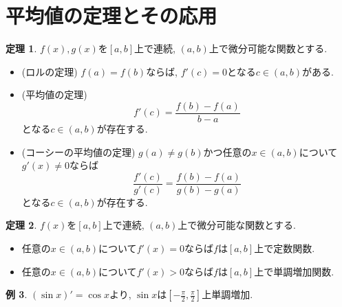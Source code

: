 \documentclass[dvipdfmx,a4paper,11pt]{article}
\theoremstyle{definition}
\newtheorem{thm}{定理}
\newtheorem{exa}[thm]{例}
\begin{document}
\section{平均値の定理とその応用}
\begin{tcolorbox}[
    colback = white,
    colframe = green!35!black,
    fonttitle = \bfseries,
    breakable = true]
    \begin{thm}
    $f(x), g(x)$を$[a,b]$上で連続, $(a,b)$上で微分可能な関数とする.
\begin{itemize}
\item (ロルの定理) $f(a) = f(b)$ならば, $f'(c) = 0$となる$c \in (a,b)$がある.
\item (平均値の定理)
$$
f'(c) = \frac{f(b)-f(a)}{b-a}
$$
となる$c \in (a,b)$が存在する. 
\item (コーシーの平均値の定理)
$g(a) \neq g(b)$かつ任意の$x \in (a,b)$について$g'(x) \neq 0$ならば
$$
\frac{f'(c)}{g'(c)} = \frac{f(b)-f(a)}{g(b)-g(a)}
$$
となる$c \in (a,b)$が存在する. 
\end{itemize}

    \end{thm}
\end{tcolorbox}

\begin{tcolorbox}[
    colback = white,
    colframe = green!35!black,
    fonttitle = \bfseries,
    breakable = true]
    \begin{thm}
    $f(x)$を$[a,b]$上で連続, $(a,b)$上で微分可能な関数とする.
\begin{itemize}
\item 任意の$x \in (a,b)$について$f'(x)=0$ならば$f$は$[a,b]$上で定数関数.
\item 任意の$x \in (a,b)$について$f'(x)>0$ならば$f$は$[a,b]$上で単調増加関数.
\end{itemize}

    \end{thm}
\end{tcolorbox}

\begin{exa}
$(\sin x)' = \cos x$より, $\sin x$は$[-\frac{\pi}{2}, \frac{\pi}{2}]$上単調増加.
\end{exa}
\end{document}
